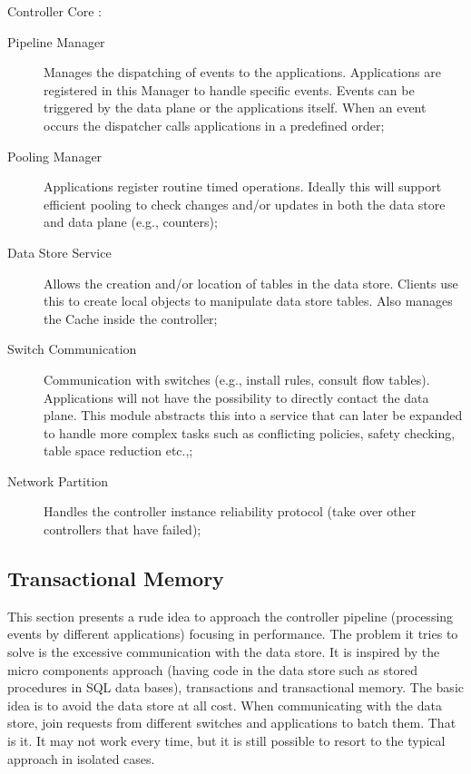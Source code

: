 \documentclass[12pt,openright,twoside]{report}
\begin{document}
Controller Core : 

\begin{description}
  \item[Pipeline Manager] Manages the dispatching of  events to the applications. Applications are registered in this Manager to handle specific events. Events can be triggered by the data plane or the applications itself. When an event  occurs the dispatcher calls applications in a predefined order;
  \item[Pooling Manager] Applications register routine timed operations. Ideally this will support efficient pooling to check changes and/or updates in both the data store and data plane (e.g., counters); 
  \item[Data Store Service] Allows the creation and/or location of tables in the data store. Clients use this to create local objects to manipulate data store tables. Also manages the Cache inside the controller; 
  \item[Switch Communication] Communication with switches (e.g., install rules, consult flow tables). Applications will not have the possibility to directly contact the data plane. This module abstracts this into a service that can later be expanded to handle more complex tasks such as conflicting policies, safety checking, table space reduction etc.,; 
  \item[Network Partition] Handles the controller instance reliability protocol (take over other controllers that have failed);
\end{description}



\subsection{Transactional Memory}

This section presents a rude idea to approach the controller pipeline (processing events by different applications) focusing in performance. The problem it tries to solve is the excessive communication with the data store. 
It is inspired by the micro components approach (having code in the data store such as stored procedures in SQL data bases), transactions and transactional memory. The basic idea is to avoid the data store at all cost. When communicating with the data store, join requests from different switches and applications to batch them. That is it. It may not work every time, but it is still possible to resort to the typical approach in isolated cases.\\
\end{document}
